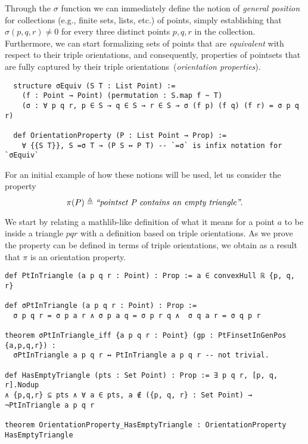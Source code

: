 Through the $\sigma$ function we can immediately define the notion of \emph{general position} for collections (e.g., finite sets, lists, etc.) of points, simply establishing that $\sigma(p, q, r) \neq 0$ for every three distinct points $p, q, r$ in the collection.
Furthermore, we can start formalizing sets of points that are \emph{equivalent} with respect to their triple orientations, and consequently, properties of pointsets that are fully captured by their triple orientations~(\emph{orientation properties}).



\begin{lstlisting}
  structure σEquiv (S T : List Point) :=
    (f : Point → Point) (permutation : S.map f ~ T)
    (σ : ∀ p q r, p ∈ S → q ∈ S → r ∈ S → σ (f p) (f q) (f r) = σ p q r)

  def OrientationProperty (P : List Point → Prop) :=
    ∀ {{S T}}, S =σ T → (P S ↔ P T) -- `=σ` is infix notation for `σEquiv`
\end{lstlisting}


For an initial example of how these notions will be used, let us consider the property 
\[
  \pi(P) \triangleq \text{\em ``pointset P contains an empty triangle''}. 
\]

We start by relating a \textsf{mathlib}-like definition of what it means for a point $a$ to be inside a triangle $pqr$ with a definition based on triple orientations. As we prove the property can be defined in terms of triple orientations, we obtain as a result that $\pi$ is an orientation property.

\begin{lstlisting}
def PtInTriangle (a p q r : Point) : Prop := a ∈ convexHull ℝ {p, q, r}

def σPtInTriangle (a p q r : Point) : Prop :=
  σ p q r = σ p a r ∧ σ p a q = σ p r q ∧  σ q a r = σ q p r
  
theorem σPtInTriangle_iff {a p q r : Point} (gp : PtFinsetInGenPos {a,p,q,r}) :
  σPtInTriangle a p q r ↔ PtInTriangle a p q r -- not trivial.

def HasEmptyTriangle (pts : Set Point) : Prop := ∃ p q r, [p, q, r].Nodup 
∧ {p,q,r} ⊆ pts ∧ ∀ a ∈ pts, a ∉ ({p, q, r} : Set Point) → ¬PtInTriangle a p q r

theorem OrientationProperty_HasEmptyTriangle : OrientationProperty HasEmptyTriangle 
\end{lstlisting}

